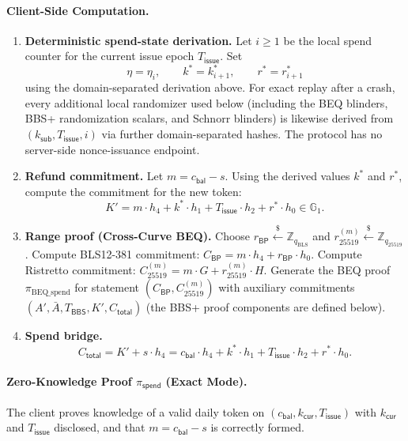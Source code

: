 \documentclass[11pt]{article}
\theoremstyle{definitionstyle}
\theoremstyle{plain}
\begin{document}
\paragraph{Client-Side Computation.}
\begin{enumerate}[leftmargin=*]
\item \textbf{Deterministic spend-state derivation.}
  Let $i \ge 1$ be the local spend counter for the current issue epoch $T_{\mathsf{issue}}$. Set
  \[
  \eta = \eta_i, \qquad k^* = k_{i+1}^*, \qquad r^* = r_{i+1}^*
  \]
  using the domain-separated derivation above. For exact replay after a crash, every additional local randomizer used below (including the BEQ blinders, BBS+ randomization scalars, and Schnorr blinders) is likewise derived from $(k_{\mathsf{sub}}, T_{\mathsf{issue}}, i)$ via further domain-separated hashes. The protocol has no server-side nonce-issuance endpoint.
\item \textbf{Refund commitment.}
  Let $m = c_{\mathsf{bal}} - s$. Using the derived values $k^*$ and $r^*$, compute the commitment for the new token:
  \[
  K' = m \cdot h_4 + k^* \cdot h_1 + T_{\mathsf{issue}} \cdot h_2 + r^* \cdot h_0 \in \mathbb{G}_1.
  \]
\item \textbf{Range proof (Cross-Curve BEQ).}
  Choose $r_{\mathsf{BP}} \xleftarrow{\$} \mathbb{Z}_{q_{\text{BLS}}}$ and $r_{25519}^{(m)} \xleftarrow{\$} \mathbb{Z}_{q_{25519}}$.
  Compute BLS12-381 commitment: $C_{\mathsf{BP}} = m \cdot h_4 + r_{\mathsf{BP}} \cdot h_0$.
  Compute Ristretto commitment: $C_{25519}^{(m)} = m \cdot G + r_{25519}^{(m)} \cdot H$.
  Generate the BEQ proof $\pi_{\text{BEQ\_spend}}$ for statement $(C_{\mathsf{BP}}, C_{25519}^{(m)})$ with auxiliary commitments $(A', \bar{A}, T_{\mathsf{BBS}}, K', C_{\mathsf{total}})$ (the BBS+ proof components are defined below).
\item \textbf{Spend bridge.}
  \[
  C_{\mathsf{total}} = K' + s \cdot h_4 = c_{\mathsf{bal}} \cdot h_4 + k^* \cdot h_1 + T_{\mathsf{issue}} \cdot h_2 + r^* \cdot h_0.
  \]
\end{enumerate}

\paragraph{Zero-Knowledge Proof $\pi_{\mathsf{spend}}$ (Exact Mode).}
The client proves knowledge of a valid daily token on $(c_{\mathsf{bal}}, k_{\mathsf{cur}}, T_{\mathsf{issue}})$ with $k_{\mathsf{cur}}$ and $T_{\mathsf{issue}}$ disclosed, and that $m = c_{\mathsf{bal}} - s$ is correctly formed.
\end{document}

